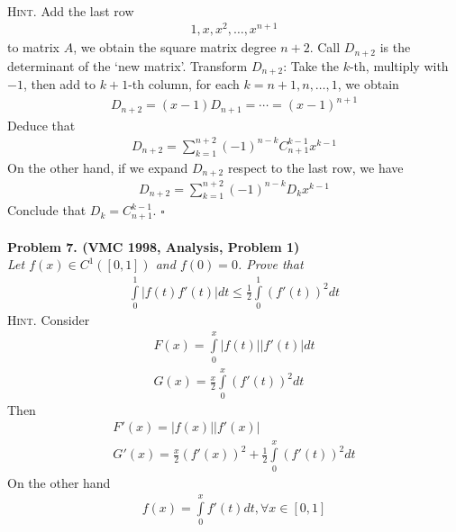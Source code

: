 \documentclass{article}
\numberwithin{equation}{section}
\begin{document}
\\
\textsc{Hint.} Add the last row 
\begin{align}
1,x,{x^2}, \ldots ,{x^{n + 1}}
\end{align}
to matrix $A$, we obtain the square matrix degree $n+2$. Call $D_{n+2}$ is the determinant of the \lq new matrix\rq. Transform $D_{n+2}$: Take the $k$-th, multiply with $-1$, then add to $k+1$-th column, for each $k = n + 1,n, \ldots ,1$, we obtain
\begin{align}
{D_{n + 2}} = \left( {x - 1} \right){D_{n + 1}} =  \cdots  = {\left( {x - 1} \right)^{n + 1}}
\end{align}
Deduce that 
\begin{align}
{D_{n + 2}} = \sum\limits_{k = 1}^{n + 2} {{{\left( { - 1} \right)}^{n - k}}C_{n + 1}^{k - 1}{x^{k - 1}}} 
\end{align}
On the other hand, if we expand $D_{n+2}$ respect to the last row, we have
\begin{align}
{D_{n + 2}} = \sum\limits_{k = 1}^{n + 2} {{{\left( { - 1} \right)}^{n - k}}{D_k}{x^{k - 1}}}
\end{align}
Conclude that ${D_k} = C_{n + 1}^{k - 1}$. \hfill $\square$\\
\\
\textbf{Problem 7. (VMC 1998, Analysis, Problem 1)}\\
\textit{Let $f\left( x \right) \in {C^1}\left( {\left[ {0,1} \right]} \right)$ and $f(0)=0$. Prove that}
\begin{align}
\int\limits_0^1 {\left| {f\left( t \right)f'\left( t \right)} \right|} dt \le \frac{1}{2}\int\limits_0^1 {{{\left( {f'\left( t \right)} \right)}^2}} dt
\end{align}
\textsc{Hint.} Consider 
\begin{align}
F\left( x \right) = \int\limits_0^x {\left| {f\left( t \right)} \right|\left| {f'\left( t \right)} \right|} dt\\
G\left( x \right) = \frac{x}{2}\int\limits_0^x {{{\left( {f'\left( t \right)} \right)}^2}} dt
\end{align}
Then
\begin{align}
F'\left( x \right) = \left| {f\left( x \right)} \right|\left| {f'\left( x \right)} \right|\\
G'\left( x \right) = \frac{x}{2}{\left( {f'\left( x \right)} \right)^2} + \frac{1}{2}\int\limits_0^x {{{\left( {f'\left( t \right)} \right)}^2}} dt
\end{align}
On the other hand
\begin{align}
f\left( x \right) = \int\limits_0^x {f'\left( t \right)} dt,\forall x \in \left[ {0,1} \right]
\end{align}
\end{document}
